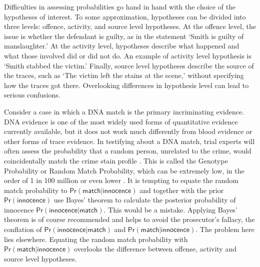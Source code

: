 \documentclass{article}
\newcommand{\pr}{\mathsf{Pr}}
\begin{document}
Difficulties in assessing  probabilities go hand in hand with the choice of the hypotheses of interest. To some approximation, hypotheses can be divided into three levels: offence, activity, and source level hypotheses. At the offence level, the issue is whether the defendant is guilty, as in the statement `Smith is guilty of manslaughter.'  At the activity level, hypotheses describe what happened and what those involved did or did not do. An example of activity level hypothesis is `Smith stabbed the victim.' Finally, source level hypotheses describe the source of the traces, such as  `The victim left the stains at the scene,' without specifying how the traces got there. Overlooking differences in hypothesis level can lead to serious confusions. 

Consider a case in which a DNA match is the primary incriminating evidence. DNA evidence is one of the most widely used forms of quantitative evidence currently available, but it does not work much differently from blood evidence or other forms of trace evidence. In testifying about a DNA match, trial experts will often assess the probability that a random person, unrelated to the crime, would coincidentally match the crime stain profile  
\citep{foreman2003interpreting}.
This is called the Genotype Probability or Random Match Probability, which can be extremely low, in the order of 1 in 100 million or even lower \citep{donnelly1995NonindependenceMatchesDifferent, Kaye2000ReferDNA,Wasserman2008Forensic}. 
It is tempting to 
equate the random match probability to $\pr(\textsf{match} \vert \textsf{innocence})$ and together with the prior $\pr(\textsf{innocence})$ use Bayes' theorem to calculate  
the posterior probability of innocence $\pr(\textsf{innocence} \vert \textsf{match})$. 
This would be a mistake.
%
Applying Bayes' theorem is of course recommended and helps to avoid the prosecutor's fallacy, the conflation of $\pr(\textsf{innocence} \vert \textsf{match})$ and $\pr(\textsf{match} \vert \textsf{innocence})$.
The problem here lies elsewhere. 
Equating the random match probability with $\pr(\textsf{match} \vert \textsf{innocence})$ overlooks the difference between offense, activity and source level hypotheses.
\end{document}
